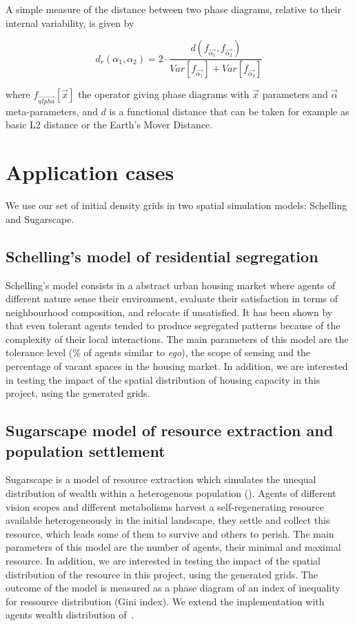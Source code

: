 \documentclass[11pt]{article}
\begin{document}
A simple measure of the distance between two phase diagrams, relative to their internal variability, is given by

\[
d_r\left(\alpha_1,\alpha_2\right) = 2 \cdot \frac{d(f_{\vec{\alpha_1}},f_{\vec{\alpha_2}})}{Var\left[f_{\vec{\alpha_1}}\right] + Var\left[f_{\vec{\alpha_2}}\right]}
\]

where $f_{\vec{alpha}}\left[\vec{x}\right]$ the operator giving phase diagrams with $\vec{x}$ parameters and $\vec{\alpha}$ meta-parameters, and $d$ is a functional distance that can be taken for example as basic L2 distance or the Earth's Mover Distance.




\section{Application cases}

We use our set of initial density grids in two spatial simulation models: Schelling and Sugarscape.

\subsection{Schelling's model of residential segregation}

Schelling's model consists in a abstract urban housing market where agents of different nature sense their environment, evaluate their satisfaction in terms of neighbourhood composition, and relocate if unsatisfied. It has been shown by \cite{Schelling1969} that even tolerant agents tended to produce segregated patterns because of the complexity of their local interactions. The main parameters of this model are the tolerance level (\% of agents similar to {\it ego}), the scope of sensing and the percentage of vacant spaces in the housing market. In addition, we are interested in testing the impact of the spatial distribution of housing capacity in this project, using the generated grids.

\subsection{Sugarscape model of resource extraction and population settlement}

Sugarscape is a model of resource extraction which simulates the unequal distribution of wealth within a heterogenous population (\cite{EpsteinAxtell1996}). Agents of different vision scopes and different metabolisms harvest a self-regenerating resource available heterogeneously in the initial landscape, they settle and collect this resource, which leads some of them to survive and others to perish. The main parameters of this model are the number of agents, their minimal and maximal resource. In addition, we are interested in testing the impact of the spatial distribution of the resource in this project, using the generated grids. The outcome of the model is measured as a phase diagram of an index of inequality for ressource distribution (Gini index). We extend the implementation with agents wealth distribution of~\cite{li2009netlogo}.
\end{document}
